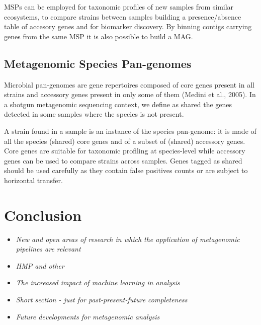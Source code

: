 \documentclass{article}
\begin{document}
MSPs can be employed for taxonomic profiles of new samples from similar ecosystems, to compare strains between samples building a presence/absence table of accesory genes and for biomarker discovery. By binning contigs carrying genes from the same MSP it is also possible to build a MAG.



\subsection{Metagenomic Species Pan-genomes}
Microbial pan-genomes are gene repertoires composed of core genes present in all strains and accessory genes present in only some of them (Medini et al., 2005). In a shotgun metagenomic sequencing context, we define as shared the genes detected in some samples where the species is not present.

A strain found in a sample is an instance of the species pan-genome: it is made of all the species (shared) core genes and of a subset of (shared) accessory genes. Core genes are suitable for taxonomic profiling at species-level while accessory genes can be used to compare strains across samples. Genes tagged as shared should be used carefully as they contain false positives counts or are subject to horizontal transfer.
 


	\section{Conclusion}
\begin{itemize}
	\item \emph{New and open areas of research in which the application of metagenomic pipelines are relevant}
	\item \emph{HMP and other }
	\item \emph{The increased impact of machine learning in analysis}
	\item \emph{Short section - just for past-present-future completeness}
	\item \emph{Future developments for metagenomic analysis}
\end{itemize}



\end{document}
